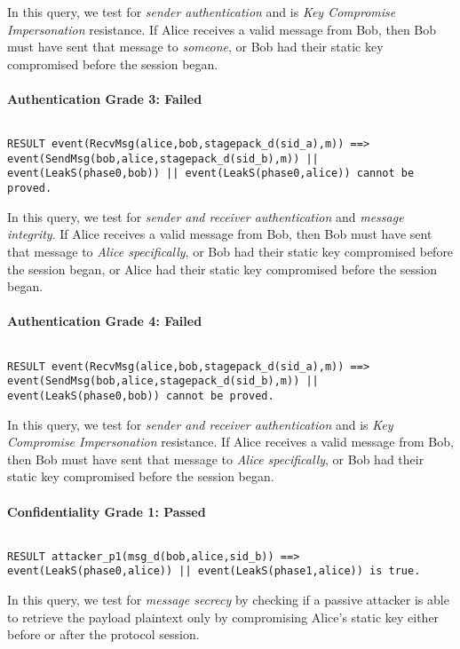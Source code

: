In this query, we test for \emph{sender authentication} and is \emph{Key Compromise Impersonation} resistance. If Alice receives a valid message from Bob, then Bob must have sent that message to \emph{someone}, or Bob had their static key compromised before the session began.


\paragraph{Authentication Grade 3: Failed}$ $
\begin{lstlisting}
RESULT event(RecvMsg(alice,bob,stagepack_d(sid_a),m)) ==> event(SendMsg(bob,alice,stagepack_d(sid_b),m)) || event(LeakS(phase0,bob)) || event(LeakS(phase0,alice)) cannot be proved.
\end{lstlisting}

In this query, we test for \emph{sender and receiver authentication} and \emph{message integrity}. If Alice receives a valid message from Bob, then Bob must have sent that message to \emph{Alice specifically}, or Bob had their static key compromised before the session began, or Alice had their static key compromised before the session began.


\paragraph{Authentication Grade 4: Failed}$ $
\begin{lstlisting}
RESULT event(RecvMsg(alice,bob,stagepack_d(sid_a),m)) ==> event(SendMsg(bob,alice,stagepack_d(sid_b),m)) || event(LeakS(phase0,bob)) cannot be proved.
\end{lstlisting}

In this query, we test for \emph{sender and receiver authentication} and is \emph{Key Compromise Impersonation} resistance. If Alice receives a valid message from Bob, then Bob must have sent that message to \emph{Alice specifically}, or Bob had their static key compromised before the session began.


\paragraph{Confidentiality Grade 1: Passed}$ $
\begin{lstlisting}
RESULT attacker_p1(msg_d(bob,alice,sid_b)) ==> event(LeakS(phase0,alice)) || event(LeakS(phase1,alice)) is true.
\end{lstlisting}

In this query, we test for \emph{message secrecy} by checking if a passive attacker is able to retrieve the payload plaintext only by compromising Alice's static key either before or after the protocol session.


